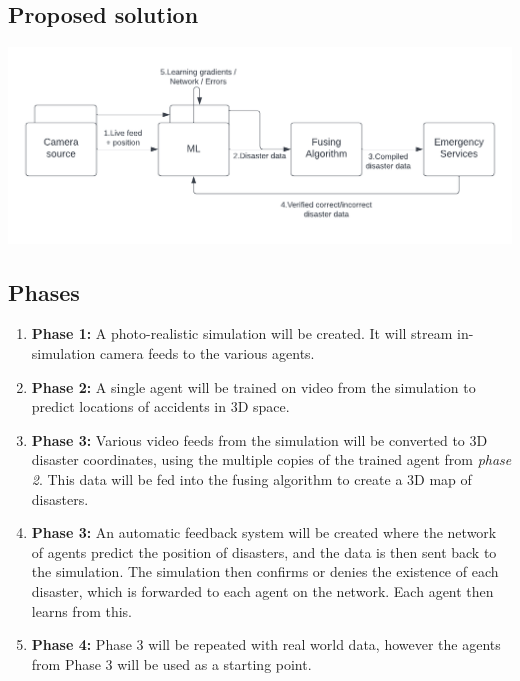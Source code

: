 \documentclass{article}
\begin{document}
\subsection{Proposed solution}
\begin{center}
	\includegraphics[scale=0.75]{proj}
\end{center}

\subsection{Phases}
\begin{enumerate}
	\item \textbf{Phase 1:} A photo-realistic simulation will be created. It will stream in-simulation camera feeds to the various agents.
	\item \textbf{Phase 2:} A single agent will be trained on video from the simulation to predict locations of accidents in 3D space.
	\item \textbf{Phase 3:} Various video feeds from the simulation will be converted to 3D disaster coordinates, using the multiple copies of the trained agent from \emph{phase 2}. This data will be fed into the fusing algorithm to create a 3D map of disasters.
	\item \textbf{Phase 3:} An automatic feedback system will be created where the network of agents predict the position of disasters, and the data is then sent back to the simulation. The simulation then confirms or denies the existence of each disaster, which is forwarded to each agent on the network. Each agent then learns from this.
	\item \textbf{Phase 4:} Phase 3 will be repeated with real world data, however the agents from Phase 3 will be used as a starting point.
\end{enumerate}
\end{document}
